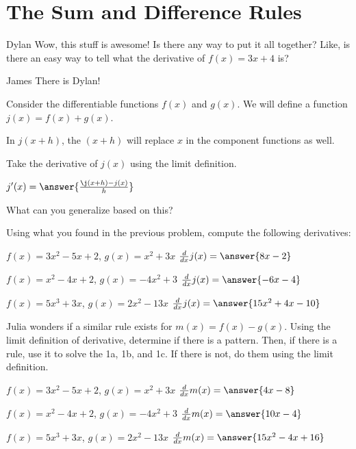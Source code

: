 \documentclass{ximera}
\begin{document}
\section{The Sum and Difference Rules}
\begin{dialogue}
\item[Dylan] Wow, this stuff is awesome! Is there any way to put it all together? Like, is there an easy way to tell what the derivative of $f(x) = 3x+4$ is?
\item[James] There is Dylan!
\end{dialogue}

\begin{question}
Consider the differentiable functions $f(x)$ and $g(x)$. We will define a function $j(x) = f(x) + g(x)$.

\begin{hint}
In $j(x+h)$, the $(x+h)$ will replace $x$ in the component functions as well.
\end{hint}
Take the derivative of $j(x)$ using the limit definition.

$j'(x) =  \answer{\frac{\j(x+h)-j(x)}{h}}$

What can you generalize based on this?

\begin{multipleChoice}
\end{multipleChoice}
\end{question}
\begin{question}
Using what you found in the previous problem, compute the following derivatives:

$f(x) = 3x^2 - 5x + 2$, $g(x) = x^2 + 3x$ \hspace{11mm} $\frac{d}{dx}j(x) =  \answer{8x-2}$

$f(x) = x^2 - 4x + 2$, $g(x) = -4x^2 + 3$ \hspace{10mm} $\frac{d}{dx}j(x) = \answer{-6x-4}$

$f(x) = 5x^3 + 3x$, $g(x) = 2x^2 - 13x$ \hspace{13mm} $\frac{d}{dx}j(x) =  \answer{15x^2+4x-10}$
\end{question}
\begin{question}
Julia wonders if a similar rule exists for $m(x) = f(x)-g(x)$. Using the limit definition of derivative, determine if there is a pattern. Then, if there is a rule, use it to solve the 1a, 1b, and 1c. If there is not, do them using the limit definition.

$f(x) = 3x^2 - 5x + 2$, $g(x) = x^2 + 3x$ \hspace{11mm} $\frac{d}{dx}m(x) =  \answer{4x-8}$

$f(x) = x^2 - 4x + 2$, $g(x) = -4x^2 + 3$ \hspace{10mm} $\frac{d}{dx}m(x) =  \answer{10x-4}$

$f(x) = 5x^3 + 3x$, $g(x) = 2x^2 - 13x$ \hspace{13mm} $\frac{d}{dx}m(x) =  \answer{15x^2-4x+16}$
\end{question}
\end{document}
